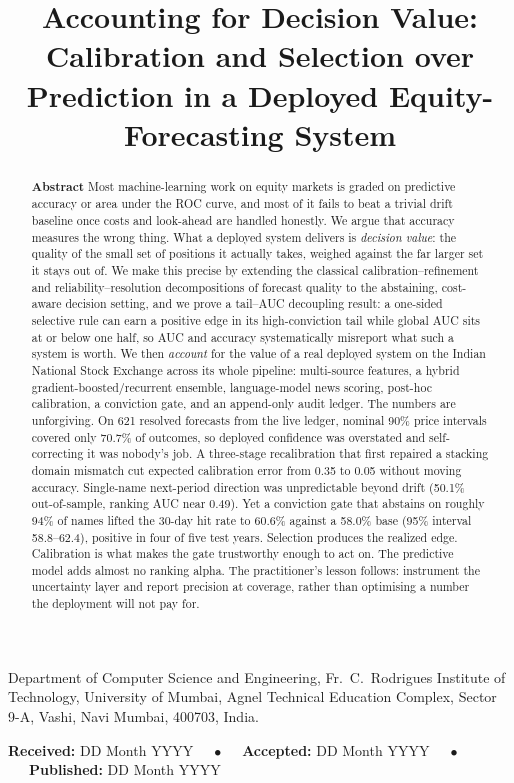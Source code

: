 \documentclass{sbc2023}%
\title[Accounting for Decision Value]{Accounting for Decision Value: Calibration and Selection over Prediction in a Deployed Equity-Forecasting System}
\author[Pardeshi and Deshmukh 2026]{
\affil{\textbf{Anandkumar Pardeshi}~\href{https://orcid.org/0000-0002-1825-0097}{\textcolor{orcidlogo}{\aiOrcid}}~\textcolor{blue}{\faEnvelopeO}~~[~\textbf{Fr.\ C.\ Rodrigues Institute of Technology, University of Mumbai}~|\href{mailto:anand.pardeshi@fcrit.ac.in}{~\textbf{\textit{anand.pardeshi@fcrit.ac.in}}}~]}

\affil{\textbf{Sujata Deshmukh}~\href{https://orcid.org/0000-0001-5109-3700}{\textcolor{orcidlogo}{\aiOrcid}}~~[~\textbf{Fr.\ C.\ Rodrigues Institute of Technology, University of Mumbai}~|\href{mailto:sujata.deshmukh@fcrit.ac.in}{~\textbf{\textit{sujata.deshmukh@fcrit.ac.in}}}~]}
}
\theoremstyle{definition}
\theoremstyle{plain}
\begin{document}
\begin{frontmatter}
\maketitle

\begin{mail}
Department of Computer Science and Engineering, Fr.\ C.\ Rodrigues Institute of Technology, University of Mumbai, Agnel Technical Education Complex, Sector 9-A, Vashi, Navi Mumbai, 400703, India.
\end{mail}

\begin{dates}
\small{\textbf{Received:} DD Month YYYY~~~$\bullet$~~~\textbf{Accepted:} DD Month YYYY~~~$\bullet$~~~\textbf{Published:} DD Month YYYY}
\end{dates}

\begin{abstract}
\textbf{Abstract}
\noindent Most machine-learning work on equity markets is graded on predictive accuracy or area under the ROC curve, and most of it fails to beat a trivial drift baseline once costs and look-ahead are handled honestly. We argue that accuracy measures the wrong thing. What a deployed system delivers is \emph{decision value}: the quality of the small set of positions it actually takes, weighed against the far larger set it stays out of. We make this precise by extending the classical calibration--refinement and reliability--resolution decompositions of forecast quality to the abstaining, cost-aware decision setting, and we prove a tail--AUC decoupling result: a one-sided selective rule can earn a positive edge in its high-conviction tail while global AUC sits at or below one half, so AUC and accuracy systematically misreport what such a system is worth. We then \emph{account} for the value of a real deployed system on the Indian National Stock Exchange across its whole pipeline: multi-source features, a hybrid gradient-boosted/recurrent ensemble, language-model news scoring, post-hoc calibration, a conviction gate, and an append-only audit ledger. The numbers are unforgiving. On 621 resolved forecasts from the live ledger, nominal 90\% price intervals covered only 70.7\% of outcomes, so deployed confidence was overstated and self-correcting it was nobody's job. A three-stage recalibration that first repaired a stacking domain mismatch cut expected calibration error from 0.35 to 0.05 without moving accuracy. Single-name next-period direction was unpredictable beyond drift (50.1\% out-of-sample, ranking AUC near 0.49). Yet a conviction gate that abstains on roughly 94\% of names lifted the 30-day hit rate to 60.6\% against a 58.0\% base (95\% interval 58.8--62.4), positive in four of five test years. Selection produces the realized edge. Calibration is what makes the gate trustworthy enough to act on. The predictive model adds almost no ranking alpha. The practitioner's lesson follows: instrument the uncertainty layer and report precision at coverage, rather than optimising a number the deployment will not pay for.
\end{abstract}


\end{frontmatter}
\end{document}
